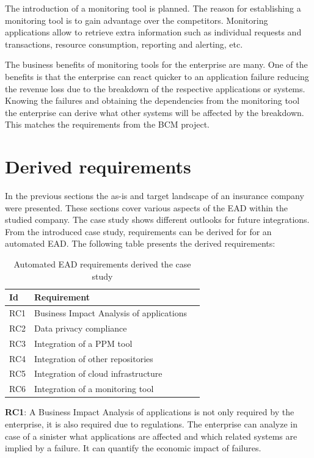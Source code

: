 The introduction of a monitoring tool is planned. The reason for establishing a monitoring tool is to gain advantage over the competitors. Monitoring applications allow to retrieve extra information such as individual requests and transactions, resource consumption, reporting and alerting, etc.

The business benefits of monitoring tools for the enterprise are many. One of the benefits is that the enterprise can react quicker to an application failure reducing the revenue loss due to the breakdown of the respective applications or systems. Knowing the failures and obtaining the dependencies from the monitoring tool the enterprise can derive what other systems will be affected by the breakdown. This matches the requirements from the BCM project.

\section{Derived requirements}\label{section:derivedrequirements}

In the previous sections the as-is and target landscape of an insurance company were presented. These sections cover various aspects of the EAD within the studied company. The case study shows different outlooks for future integrations. From the introduced case study, requirements can be derived for for an automated EAD. The following table presents the derived requirements:

\begin{table}[htpb]
  \caption[Automated EAD requirements derived from the case study]{Automated EAD requirements derived the case study}\label{tab:sample}
  \centering
  \begin{tabular}{l l l}
    \toprule
      Id & Requirement\\
    \midrule
      RC1 & Business Impact Analysis of applications\\
      RC2 & Data privacy compliance\\
      RC3 & Integration of a PPM tool\\
      RC4 & Integration of other repositories\\
      RC5 & Integration of cloud infrastructure\\
      RC6 & Integration of a monitoring tool\\
    \bottomrule
  \end{tabular}
\end{table}

\textbf{RC1}: A Business Impact Analysis of applications is not only required by the enterprise, it is also required due to regulations. The enterprise can analyze in case of a sinister what applications are affected and which related systems are implied by a failure. It can quantify the economic impact of failures.

